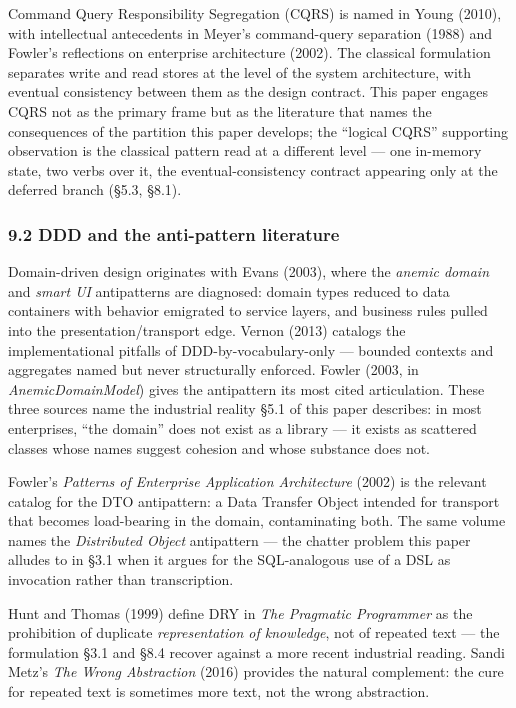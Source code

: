 \documentclass[
]{article}
\begin{document}
Command Query Responsibility Segregation (CQRS) is named in Young
(2010), with intellectual antecedents in Meyer's command-query
separation (1988) and Fowler's reflections on enterprise architecture
(2002). The classical formulation separates write and read stores at the
level of the system architecture, with eventual consistency between them
as the design contract. This paper engages CQRS not as the primary frame
but as the literature that names the consequences of the partition this
paper develops; the ``logical CQRS'' supporting observation is the
classical pattern read at a different level --- one in-memory state, two
verbs over it, the eventual-consistency contract appearing only at the
deferred branch (§5.3, §8.1).

\subsubsection{9.2 DDD and the anti-pattern
literature}\label{ddd-and-the-anti-pattern-literature}

Domain-driven design originates with Evans (2003), where the
\emph{anemic domain} and \emph{smart UI} antipatterns are diagnosed:
domain types reduced to data containers with behavior emigrated to
service layers, and business rules pulled into the
presentation/transport edge. Vernon (2013) catalogs the implementational
pitfalls of DDD-by-vocabulary-only --- bounded contexts and aggregates
named but never structurally enforced. Fowler (2003, in
\emph{AnemicDomainModel}) gives the antipattern its most cited
articulation. These three sources name the industrial reality §5.1 of
this paper describes: in most enterprises, ``the domain'' does not exist
as a library --- it exists as scattered classes whose names suggest
cohesion and whose substance does not.

Fowler's \emph{Patterns of Enterprise Application Architecture} (2002)
is the relevant catalog for the DTO antipattern: a Data Transfer Object
intended for transport that becomes load-bearing in the domain,
contaminating both. The same volume names the \emph{Distributed Object}
antipattern --- the chatter problem this paper alludes to in §3.1 when
it argues for the SQL-analogous use of a DSL as invocation rather than
transcription.

Hunt and Thomas (1999) define DRY in \emph{The Pragmatic Programmer} as
the prohibition of duplicate \emph{representation of knowledge}, not of
repeated text --- the formulation §3.1 and §8.4 recover against a more
recent industrial reading. Sandi Metz's \emph{The Wrong Abstraction}
(2016) provides the natural complement: the cure for repeated text is
sometimes more text, not the wrong abstraction.
\end{document}
